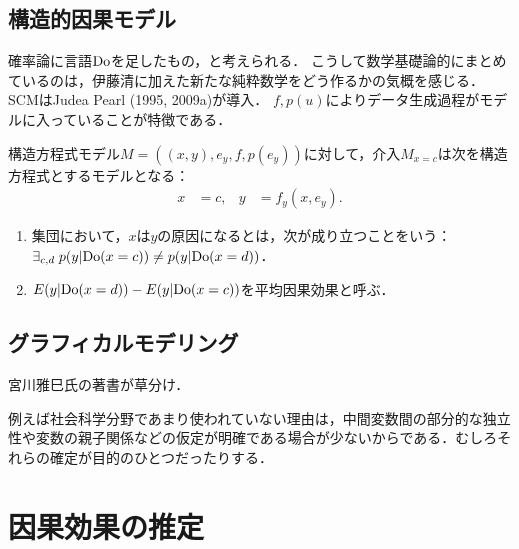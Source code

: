 \documentclass[uplatex,dvipdfmx]{jsreport}
\begin{document}
\subsection{構造的因果モデル}

\begin{tcolorbox}[colframe=ForestGreen, colback=ForestGreen!10!white,breakable,colbacktitle=ForestGreen!40!white,coltitle=black,fonttitle=\bfseries\sffamily,
title=]
    確率論に言語$\mathrm{Do}$を足したもの，と考えられる．
    こうして数学基礎論的にまとめているのは，伊藤清に加えた新たな純粋数学をどう作るかの気概を感じる．
    SCMはJudea Pearl (1995, 2009a)が導入．
    $f,p(u)$によりデータ生成過程がモデルに入っていることが特徴である．
\end{tcolorbox}

\begin{definition}
    構造方程式モデル$M=((x,y),e_y,f,p(e_y))$に対して，介入$M_{x=c}$は次を構造方程式とするモデルとなる：
    \begin{align*}
        x&=c,&y&=f_y(x,e_y).
    \end{align*}
    \begin{enumerate}
        \item 集団において，$x$は$y$の原因になるとは，次が成り立つことをいう：$\exists_{c,d}\;p(y|\mathrm{Do}(x=c))\ne p(y|\mathrm{Do}(x=d))$．
        \item $E(y|\mathrm{Do}(x=d))-E(y|\mathrm{Do}(x=c))$を平均因果効果と呼ぶ．
    \end{enumerate}
\end{definition}

\subsection{グラフィカルモデリング}

\begin{tcolorbox}[colframe=ForestGreen, colback=ForestGreen!10!white,breakable,colbacktitle=ForestGreen!40!white,coltitle=black,fonttitle=\bfseries\sffamily,
title=]
    宮川雅巳氏の著書が草分け．
\end{tcolorbox}

\begin{discussion}[工学分野が主流]
    例えば社会科学分野であまり使われていない理由は，中間変数間の部分的な独立性や変数の親子関係などの仮定が明確である場合が少ないからである．むしろそれらの確定が目的のひとつだったりする．
\end{discussion}

\section{因果効果の推定}
\end{document}

